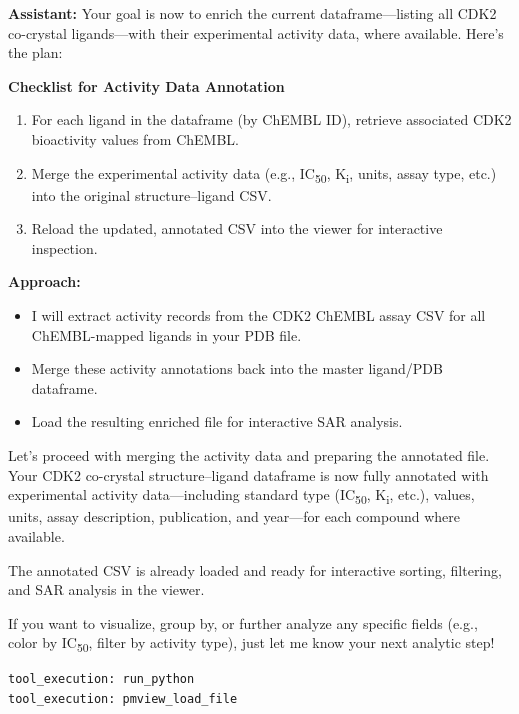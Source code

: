 \documentclass{article}
\begin{document}
\begin{assistantbox}
\textbf{Assistant:} Your goal is now to enrich the current dataframe—listing all CDK2 co-crystal ligands—with their experimental activity data, where available. Here’s the plan:

\textbf{Checklist for Activity Data Annotation}
\begin{enumerate}[label=\arabic*.]
    \item For each ligand in the dataframe (by ChEMBL ID), retrieve associated CDK2 bioactivity values from ChEMBL.
    \item Merge the experimental activity data (e.g., IC\textsubscript{50}, K\textsubscript{i}, units, assay type, etc.) into the original structure–ligand CSV.
    \item Reload the updated, annotated CSV into the viewer for interactive inspection.
\end{enumerate}

\textbf{Approach:}
\begin{itemize}
    \item I will extract activity records from the CDK2 ChEMBL assay CSV for all ChEMBL-mapped ligands in your PDB file.
    \item Merge these activity annotations back into the master ligand/PDB dataframe.
    \item Load the resulting enriched file for interactive SAR analysis.
\end{itemize}

Let’s proceed with merging the activity data and preparing the annotated file. Your CDK2 co-crystal structure–ligand dataframe is now fully annotated with experimental activity data—including standard type (IC\textsubscript{50}, K\textsubscript{i}, etc.), values, units, assay description, publication, and year—for each compound where available.

The annotated CSV is already loaded and ready for interactive sorting, filtering, and SAR analysis in the viewer.

If you want to visualize, group by, or further analyze any specific fields (e.g., color by IC\textsubscript{50}, filter by activity type), just let me know your next analytic step!
\begin{verbatim}
tool_execution: run_python
tool_execution: pmview_load_file
\end{verbatim}
\end{assistantbox}

\vspace{1.5em}
\end{document}
